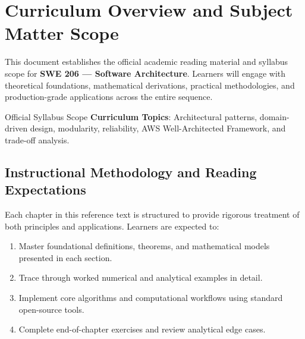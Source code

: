 \section{Curriculum Overview and Subject Matter Scope}

This document establishes the official academic reading material and syllabus scope for \textbf{SWE 206 --- Software Architecture}. Learners will engage with theoretical foundations, mathematical derivations, practical methodologies, and production-grade applications across the entire sequence.

\begin{InsightBox}{Official Syllabus Scope}
  \textbf{Curriculum Topics}: Architectural patterns, domain-driven design, modularity, reliability, AWS Well-Architected Framework, and trade-off analysis.
\end{InsightBox}

\subsection{Instructional Methodology and Reading Expectations}

Each chapter in this reference text is structured to provide rigorous treatment of both principles and applications. Learners are expected to:
\begin{enumerate}
  \item Master foundational definitions, theorems, and mathematical models presented in each section.
  \item Trace through worked numerical and analytical examples in detail.
  \item Implement core algorithms and computational workflows using standard open-source tools.
  \item Complete end-of-chapter exercises and review analytical edge cases.
\end{enumerate}

